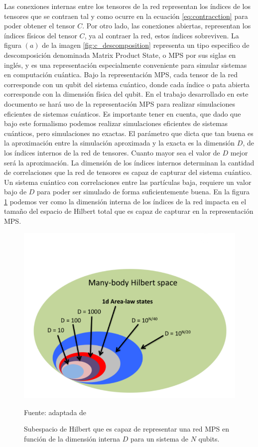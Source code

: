 \newpage

Las conexiones internas entre los tensores de la red representan los índices de los tensores que se contraen tal y como ocurre en la ecuación \ref{eq:contracction} para poder obtener el tensor $C$. Por otro lado, las conexiones abiertas, representan los índices físicos del tensor $C$, ya al contraer la red, estos índices sobreviven. La figura $(a)$ de la imagen \ref{fig:c_descomposition} representa un tipo especifico de descomposición denominada Matrix Product State, o MPS por sus siglas en inglés, y es una representación especialmente conveniente para simular sistemas en computación cuántica. Bajo la representación MPS, cada tensor de la red corresponde con un qubit del sistema cuántico, donde cada índice o pata abierta corresponde con la dimensión física del qubit. En el trabajo desarrollado en este documento se hará uso de la representación MPS para realizar simulaciones eficientes de sistemas cuánticos. Es importante tener en cuenta, que dado que bajo este formalismo podemos realizar simulaciones eficientes de sistemas cuánticos, pero simulaciones no exactas. El parámetro que dicta que tan buena es la aproximación entre la simulación aproximada y la exacta es la dimensión $D$, de los índices internos de la red de tensores. Cuanto mayor sea el valor de $D$ mejor será la aproximación. La dimensión de los índices internos determinan la cantidad de correlaciones que la red de tensores es capaz de capturar del sistema cuántico. Un sistema cuántico con correlaciones entre las partículas baja, requiere un valor bajo de $D$ para poder ser simulado de forma suficientemente buena. En la figura \ref{fig:mps_hilbert_space} podemos ver como la dimensión interna de los índices de la red impacta en el tamaño del espacio de Hilbert total que es capaz de capturar en la representación MPS.


\begin{figure}[!ht]
    \centering
    \includegraphics[scale = 0.55]{img/03-mps_espacio_hilbert.png}
    \caption{Subespacio de Hilbert que es capaz de representar una red MPS en función de la dimensión interna $D$ para un sistema de $N$ qubits.}
    Fuente: adaptada de \citep{orus} 
    \label{fig:mps_hilbert_space}
\end{figure}

